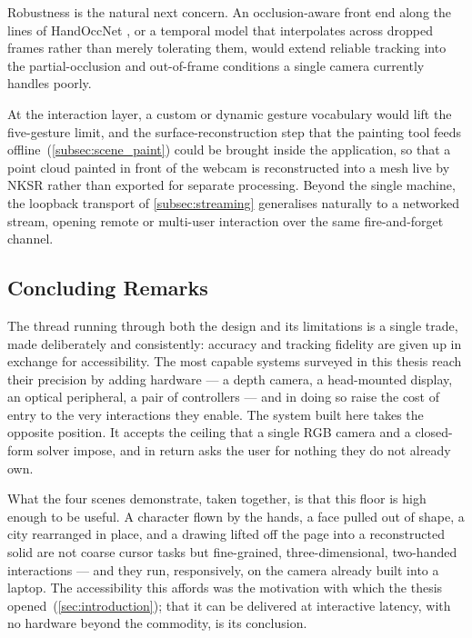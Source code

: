 Robustness is the natural next concern. An occlusion-aware front end along the lines of
HandOccNet \cite{park2022handoccnet}, or a temporal model that interpolates across
dropped frames rather than merely tolerating them, would extend reliable tracking into
the partial-occlusion and out-of-frame conditions a single camera currently handles
poorly.

At the interaction layer, a custom or dynamic gesture vocabulary would lift the
five-gesture limit, and the surface-reconstruction step that the painting tool feeds
offline~(\autoref{subsec:scene_paint}) could be brought inside the application, so that
a point cloud painted in front of the webcam is reconstructed into a mesh live by
NKSR \cite{huang2023nksr} rather than exported for separate processing. Beyond the
single machine, the loopback transport of \autoref{subsec:streaming} generalises
naturally to a networked stream, opening remote or multi-user interaction over the same
fire-and-forget channel.

\subsection{Concluding Remarks}\label{subsec:conclusion_closing}

The thread running through both the design and its limitations is a single trade, made
deliberately and consistently: accuracy and tracking fidelity are given up in exchange
for accessibility. The most capable systems surveyed in this thesis reach their
precision by adding hardware --- a depth camera, a head-mounted display, an optical
peripheral, a pair of controllers --- and in doing so raise the cost of entry to the
very interactions they enable. The system built here takes the opposite position. It
accepts the ceiling that a single RGB camera and a closed-form solver impose, and in
return asks the user for nothing they do not already own.

What the four scenes demonstrate, taken together, is that this floor is high enough to
be useful. A character flown by the hands, a face pulled out of shape, a city
rearranged in place, and a drawing lifted off the page into a reconstructed solid are
not coarse cursor tasks but fine-grained, three-dimensional, two-handed interactions
--- and they run, responsively, on the camera already built into a laptop. The
accessibility this affords was the motivation with which the thesis
opened~(\autoref{sec:introduction}); that it can be delivered at interactive latency,
with no hardware beyond the commodity, is its conclusion.

